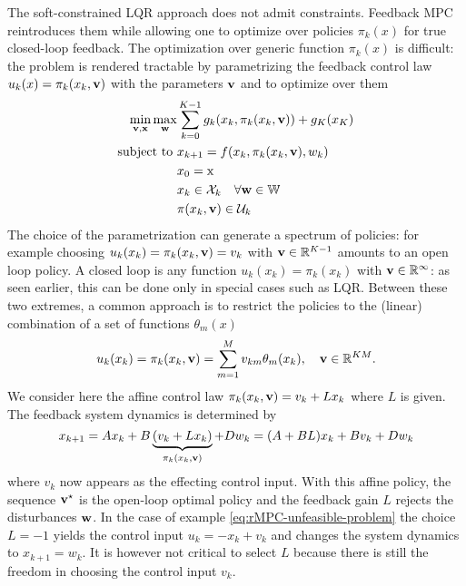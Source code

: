 The soft-constrained LQR approach does not admit constraints. Feedback MPC reintroduces them while allowing one to optimize over policies $\pi_k(x)$ for true closed-loop feedback. The optimization over generic function $\pi_k(x)$ is difficult: the problem is rendered tractable by parametrizing the feedback control law $u_k(x) = \pi_k(x_k,\boldsymbol{\mathrm{v}})$ with the parameters $\boldsymbol{\mathrm{v}}$ and to optimize over them
\begin{equation}
  \label{eq:feedback-MPC}
  \begin{aligned}
    \min_{\bsv,\bsx} \max_{\bsw} & \sum_{k=0}^{K-1} g_k(x_k,\pi_k(x_k,\bsv)) + g_K(x_K) \\
    \text{subject to } & x_{k+1} = f(x_k,\pi_k(x_k,\bsv),w_k) \\
                                 & x_0 = \mathrm{x} \\
                                 & x_k \in \mathcal{X}_k\quad \forall \bsw \in \mathbb{W} \\
                                 & \pi(x_k,\bsv) \in \mathcal{U}_k %
  \end{aligned}
\end{equation}
The choice of the parametrization can generate a spectrum of policies: for example choosing $u_k(x_k) = \pi_k(x_k,\boldsymbol{\mathrm{v}}) = v_k$ with $\boldsymbol{\mathrm{v}}\in \mathbb{R}^{K-1}$ amounts to an open loop policy. A closed loop is any function $u_k(x_k)=\pi_k(x_k)$ with $\boldsymbol{\mathrm{v}}\in \mathbb{R}^\infty$: as seen earlier, this can be done only in special cases such as LQR. Between these two extremes, a common approach is to restrict the policies to the (linear) combination of a set of functions $\theta_m(x)$
\begin{equation*}
  u_k(x_k) = \pi_k(x_k,\boldsymbol{\mathrm{v}}) = \sum_{m=1}^M v_{km}\theta_m(x_k),\quad \boldsymbol{\mathrm{v}}\in \mathbb{R}^{KM}.
\end{equation*}
We consider here the affine control law $\pi_k(x_k,\boldsymbol{\mathrm{v}}) = v_k + Lx_k$ where $L$ is given. The feedback system dynamics is determined by
\begin{equation*}
  x_{k+1} = Ax_k + B\underbrace{(v_k+Lx_k)}_{\pi_k(x_k,\boldsymbol{\mathrm{v}})} + Dw_k = (A+BL)x_k + Bv_k + Dw_k
\end{equation*}
where $v_k$ now appears as the effecting control input. With this affine policy, the sequence $\boldsymbol{\mathrm{v}}^\star$ is the open-loop optimal policy and the feedback gain $L$ rejects the disturbances $\boldsymbol{\mathrm{w}}$. In the case of example \ref{eq:rMPC-unfeasible-problem} the choice $L=-1$ yields the control input $u_k=-x_k+v_k$ and changes the system dynamics to $x_{k+1}=w_k$. It is however not critical to select $L$ because there is still the freedom in choosing the control input $v_k$.

